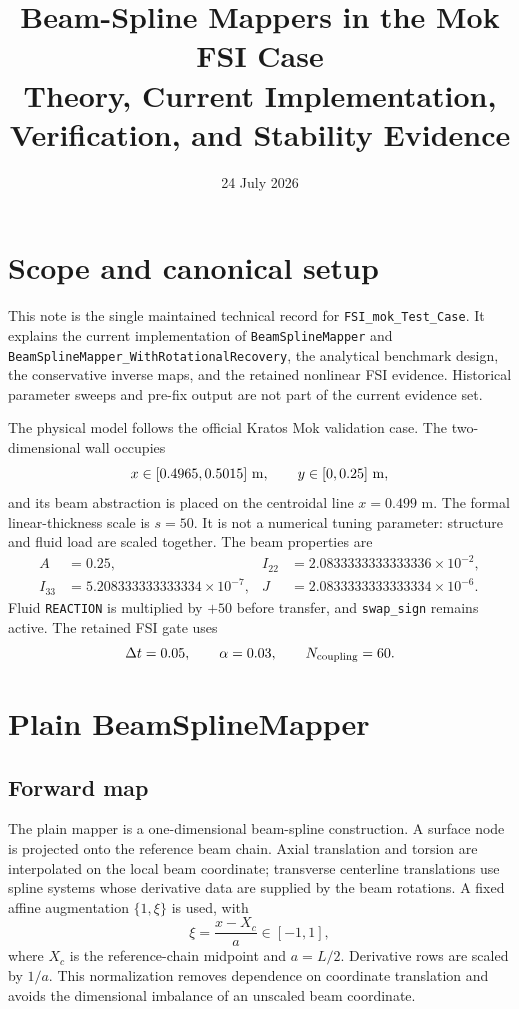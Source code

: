 \documentclass[11pt,a4paper]{article}
\title{Beam-Spline Mappers in the Mok FSI Case\\
Theory, Current Implementation, Verification, and Stability Evidence}
\author{}
\date{24 July 2026}
\begin{document}
\maketitle

\section{Scope and canonical setup}

This note is the single maintained technical record for
\texttt{FSI\_mok\_Test\_Case}.  It explains the current implementation of
\texttt{BeamSplineMapper} and
\texttt{BeamSplineMapper\_WithRotationalRecovery}, the analytical benchmark
design, the conservative inverse maps, and the retained nonlinear FSI
evidence.  Historical parameter sweeps and pre-fix output are not part of the
current evidence set.

The physical model follows the official Kratos Mok validation case.  The
two-dimensional wall occupies
\[
  x\in[0.4965,0.5015]\ {\rm m},\qquad y\in[0,0.25]\ {\rm m},
\]
and its beam abstraction is placed on the centroidal line \(x=0.499\) m.  The
formal linear-thickness scale is \(s=50\).  It is not a numerical tuning
parameter: structure and fluid load are scaled together.  The beam properties
are
\[
\begin{aligned}
 A &=0.25, &
 I_{22}&=2.0833333333333336\times10^{-2},\\
 I_{33}&=5.208333333333334\times10^{-7},&
 J&=2.0833333333333334\times10^{-6}.
\end{aligned}
\]
Fluid \texttt{REACTION} is multiplied by \(+50\) before transfer, and
\texttt{swap\_sign} remains active.  The retained FSI gate uses
\[
 \Delta t=0.05,\qquad \alpha=0.03,\qquad
 N_{\rm coupling}=60.
\]

\section{Plain BeamSplineMapper}

\subsection{Forward map}

The plain mapper is a one-dimensional beam-spline construction.  A surface
node is projected onto the reference beam chain.  Axial translation and
torsion are interpolated on the local beam coordinate; transverse centerline
translations use spline systems whose derivative data are supplied by the
beam rotations.  A fixed affine augmentation \(\{1,\xi\}\) is used, with
\[
  \xi=\frac{x-X_c}{a}\in[-1,1],
\]
where \(X_c\) is the reference-chain midpoint and \(a=L/2\).  Derivative rows
are scaled by \(1/a\).  This normalization removes dependence on coordinate
translation and avoids the dimensional imbalance of an unscaled beam
coordinate.
\end{document}
